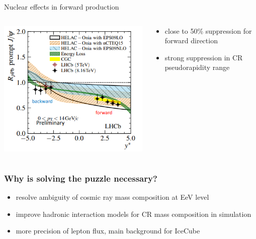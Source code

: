 \documentclass[aspectratio=1610, 9pt]{beamer}
\begin{document}
\begin{frame}{Nuclear effects in forward production}
  \begin{columns}
    \begin{column}[c]{0.48\textwidth}
      \includegraphics[width=\textwidth]{suppression.png}
    \end{column}
    \begin{column}[c]{0.48\textwidth}
      \begin{itemize}
        \item close to 50\% suppression for forward direction
        \item strong suppression in CR pseudorapidity range
      \end{itemize}
    \end{column}
  \end{columns}
\end{frame}

\begin{frame}\frametitle{Why is solving the puzzle necessary?}
  \begin{itemize}
    \item resolve ambiguity of cosmic ray mass composition at EeV level
    \item improve hadronic interaction models for CR mass composition in simulation
    \item more precision of lepton flux, main background for IceCube
  \end{itemize}
\end{frame}
\end{document}
